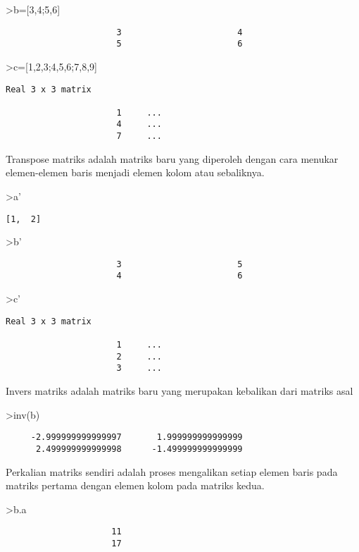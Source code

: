 \documentclass[
]{book}
\begin{document}
\textgreater b={[}3,4;5,6{]}

\begin{verbatim}
                      3                       4 
                      5                       6 
\end{verbatim}

\textgreater c={[}1,2,3;4,5,6;7,8,9{]}

\begin{verbatim}
Real 3 x 3 matrix

                      1     ...
                      4     ...
                      7     ...
\end{verbatim}

Transpose matriks adalah matriks baru yang diperoleh dengan cara menukar elemen-elemen baris menjadi elemen kolom atau sebaliknya.

\textgreater a'

\begin{verbatim}
[1,  2]
\end{verbatim}

\textgreater b'

\begin{verbatim}
                      3                       5 
                      4                       6 
\end{verbatim}

\textgreater c'

\begin{verbatim}
Real 3 x 3 matrix

                      1     ...
                      2     ...
                      3     ...
\end{verbatim}

Invers matriks adalah matriks baru yang merupakan kebalikan dari matriks asal

\textgreater inv(b)

\begin{verbatim}
     -2.999999999999997       1.999999999999999 
      2.499999999999998      -1.499999999999999 
\end{verbatim}

Perkalian matriks sendiri adalah proses mengalikan setiap elemen baris pada matriks pertama dengan elemen kolom pada matriks kedua.

\textgreater b.a

\begin{verbatim}
                     11 
                     17 
\end{verbatim}
\end{document}
